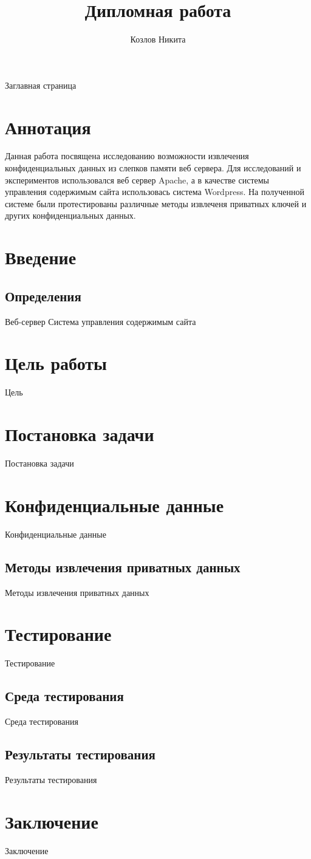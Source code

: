 \documentclass[20pt]{article}
\title{Дипломная работа}
\author{Козлов Никита}
\begin{document}
Заглавная страница

\newpage

\section*{Аннотация}

Данная работа посвящена исследованию возможности извлечения конфиденциальных данных из слепков памяти веб сервера. Для исследований и экспериментов использовался веб сервер Apache, а в качестве системы управления содержимым сайта использовась система Wordpress. На полученной системе были протестированы
различные методы извлеченя приватных ключей и других конфиденциальных данных.

\newpage

\tableofcontents
\newpage

\section{Введение}
\subsection{Определения}
Веб-сервер
Система управления содержимым сайта
\cite{some} 


\section{Цель работы}
Цель

\section{Постановка задачи}
Постановка задачи

\section{Конфиденциальные данные}
Конфиденциальные данные

\subsection{Методы извлечения приватных данных}
Методы извлечения приватных данных

\section{Тестирование}
Тестирование

\subsection{Среда тестирования}
Среда тестирования

\subsection{Результаты тестирования}
Результаты тестирования

\section{Заключение}
Заключение

 
 
\end{document}
